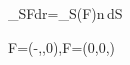 \oint_{\partial S}\mathbf F\cdot d\mathbf r=\iint_S(\nabla\times\mathbf F)\cdot\mathbf n\,dS

\mathbf F=\left(-,,0\right),\qquad \nabla\times\mathbf F=(0,0,\omega)

